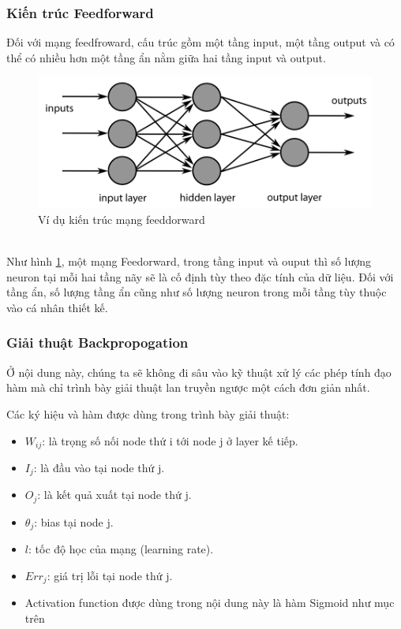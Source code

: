 		\subsubsection{Kiến trúc Feedforward}
			Đối với mạng feedfroward, cấu trúc gồm một tầng input, một tầng output và có thể có nhiều hơn một tầng ẩn nằm giữa hai tầng input và output. \\
			\begin{figure}[h!]
				\centering
				\includegraphics[scale=0.3]{charts/ffnn.png}
				\caption{Ví dụ kiến trúc mạng feeddorward \cite{ffnn-img}}
				\label{fig:ffnn}			
			\end{figure}\\
			Như hình \ref{fig:ffnn}, một mạng Feedorward, trong tầng input và ouput thì số lượng neuron tại mỗi hai tầng nãy sẽ là cố định tùy theo đặc tính của dữ liệu. Đối với tầng ẩn, số lượng tầng ẩn cũng như số lượng neuron trong mỗi tầng tùy thuộc vào cá nhân thiết kế.
			
		\subsubsection{Giải thuật Backpropogation}
		Ở nội dung này, chúng ta sẽ không đi sâu vào kỹ thuật xử lý các phép tính\cite{dl} đạo hàm mà chỉ trình bày giải thuật lan truyền ngược một cách đơn giản nhất.\par
		Các ký hiệu và hàm được dùng trong trình bày giải thuật:
		\begin{itemize}
			\item \(W_{ij}\): là trọng số nối node thứ i tới node j ở layer kế tiếp.
			\item \(I_{j}\): là đầu vào tại node thứ j.
			\item \(O_{j}\): là kết quả xuất tại node thứ j.
			\item \(\theta_{j}\): bias tại node j.
			\item \(l\): tốc độ học của mạng (learning rate).
			\item \(Err_{j}\): giá trị lỗi tại node thứ j.
			\item Activation function được dùng trong nội dung này là hàm Sigmoid như mục trên
		\end{itemize}
		
